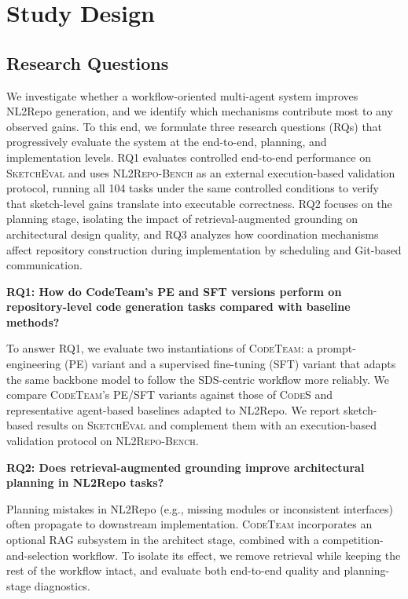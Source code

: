 \documentclass[format=acmsmall, review=false, screen=true]{acmart}
\newcommand{\tool}{\textsc{CodeTeam}\xspace}
\newcommand{\codes}{\textsc{CodeS}\xspace}
\newcommand{\sketcheval}{\textsc{SketchEval}\xspace}
\newcommand{\nlrepobench}{\textsc{NL2Repo-Bench}\xspace}
\begin{document}
\section{Study Design}\label{sec:study-design}

\subsection{Research Questions}\label{subsec:rqs}
We investigate whether a workflow-oriented multi-agent system improves NL2Repo generation, and we identify which mechanisms contribute most to any observed gains. To this end, we formulate three research questions (RQs) that progressively evaluate the system at the end-to-end, planning, and implementation levels. RQ1 evaluates controlled end-to-end performance on \sketcheval and uses \nlrepobench as an external execution-based validation protocol, running all 104 tasks under the same controlled conditions to verify that sketch-level gains translate into executable correctness. RQ2 focuses on the planning stage, isolating the impact of retrieval-augmented grounding on architectural design quality, and RQ3 analyzes how coordination mechanisms affect repository construction during implementation by scheduling and Git-based communication.

\begin{rqbox}
\textbf{RQ1: How do CodeTeam's PE and SFT versions perform on repository-level code generation tasks compared with baseline methods?}
\end{rqbox}
To answer RQ1, we evaluate two instantiations of \tool: a prompt-engineering (PE) variant and a supervised fine-tuning (SFT) variant that adapts the same backbone model to follow the SDS-centric workflow more reliably.
We compare \tool's PE/SFT variants against those of \codes and representative agent-based baselines adapted to NL2Repo. We report sketch-based results on \sketcheval and complement them with an execution-based validation protocol on \nlrepobench.

\begin{rqbox}
\textbf{RQ2: Does retrieval-augmented grounding improve architectural planning in NL2Repo tasks?}
\end{rqbox}
Planning mistakes in NL2Repo (e.g., missing modules or inconsistent interfaces) often propagate to downstream implementation. \tool incorporates an optional RAG subsystem in the architect stage, combined with a competition-and-selection workflow. To isolate its effect, we remove retrieval while keeping the rest of the workflow intact, and evaluate both end-to-end quality and planning-stage diagnostics.
\end{document}
